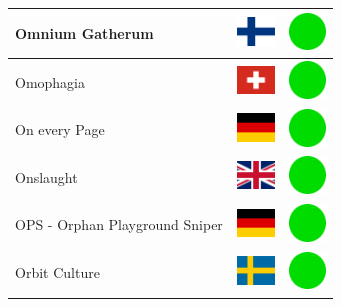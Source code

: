 \documentclass[12pt, a4paper, twoside]{report}
\begin{document}
\begin{center}
\begin{longtable}{|p{5cm}|p{2cm}|p{2cm}|}
 Omnium Gatherum                                            & \includegraphics[width=1cm]{../4x3/fi} &   \includegraphics[width=1cm]{../likes/y} \\ \hline
 Omophagia                                                  & \includegraphics[width=1cm]{../4x3/ch} &   \includegraphics[width=1cm]{../likes/y} \\ \hline
 On every Page                                              & \includegraphics[width=1cm]{../4x3/de} &   \includegraphics[width=1cm]{../likes/y} \\ \hline
 Onslaught                                                  & \includegraphics[width=1cm]{../4x3/gb} &   \includegraphics[width=1cm]{../likes/y} \\ \hline
 OPS - Orphan Playground Sniper                             & \includegraphics[width=1cm]{../4x3/de} &   \includegraphics[width=1cm]{../likes/y} \\ \hline
 Orbit Culture                                              & \includegraphics[width=1cm]{../4x3/se} &   \includegraphics[width=1cm]{../likes/y} \\ \hline

\end{longtable}
\end{center}
\end{document}
